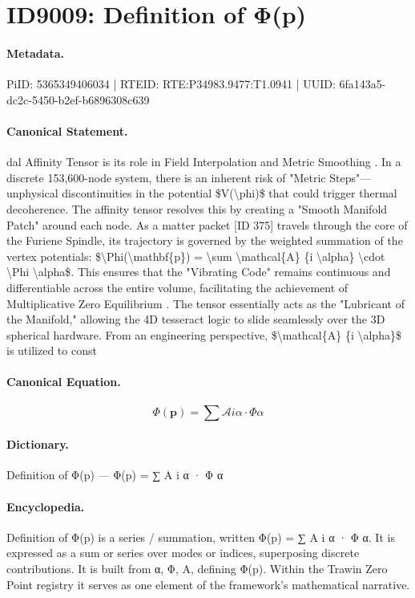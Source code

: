 \section*{ID9009: Definition of Φ(p)}
\paragraph{Metadata.}
PiID: 5365349406034 | RTEID: RTE:P34983.9477:T1.0941 | UUID: 6fa143a5-dc2c-5450-b2ef-b6896308c639

\paragraph{Canonical Statement.}
dal Affinity Tensor is its role in Field Interpolation and Metric Smoothing . In a discrete 153,600-node system, there is an inherent risk of "Metric Steps"—unphysical discontinuities in the potential \$V(\textbackslash{}phi)\$ that could trigger thermal decoherence. The affinity tensor resolves this by creating a "Smooth Manifold Patch" around each node. As a matter packet [ID 375] travels through the core of the Furiene Spindle, its trajectory is governed by the weighted summation of the vertex potentials: \$\textbackslash{}Phi(\textbackslash{}mathbf\{p\}) = \textbackslash{}sum \textbackslash{}mathcal\{A\} \{i \textbackslash{}alpha\} \textbackslash{}cdot \textbackslash{}Phi \textbackslash{}alpha\$. This ensures that the "Vibrating Code" remains continuous and differentiable across the entire volume, facilitating the achievement of Multiplicative Zero Equilibrium . The tensor essentially acts as the "Lubricant of the Manifold," allowing the 4D tesseract logic to slide seamlessly over the 3D spherical hardware. From an engineering perspective, \$\textbackslash{}mathcal\{A\} \{i \textbackslash{}alpha\}\$ is utilized to const

\paragraph{Canonical Equation.}
\[
\Phi(\mathbf{p}) = \sum \mathcal{A} {i \alpha} \cdot \Phi \alpha
\]

\paragraph{Dictionary.}
Definition of Φ(p) — Φ(p) = ∑ A i α · Φ α

\paragraph{Encyclopedia.}
Definition of Φ(p) is a series / summation, written Φ(p) = ∑ A i α · Φ α. It is expressed as a sum or series over modes or indices, superposing discrete contributions. It is built from α, Φ, A, defining Φ(p). Within the Trawin Zero Point registry it serves as one element of the framework's mathematical narrative.
